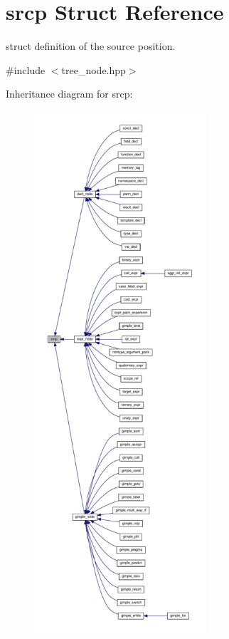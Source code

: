 \hypertarget{structsrcp}{}\section{srcp Struct Reference}
\label{structsrcp}


struct definition of the source position.  




{\ttfamily \#include $<$tree\+\_\+node.\+hpp$>$}



Inheritance diagram for srcp\+:
\nopagebreak
\begin{figure}[H]
\begin{center}
\leavevmode
\includegraphics[height=550pt]{d1/dbb/structsrcp__inherit__graph}
\end{center}
\end{figure}
